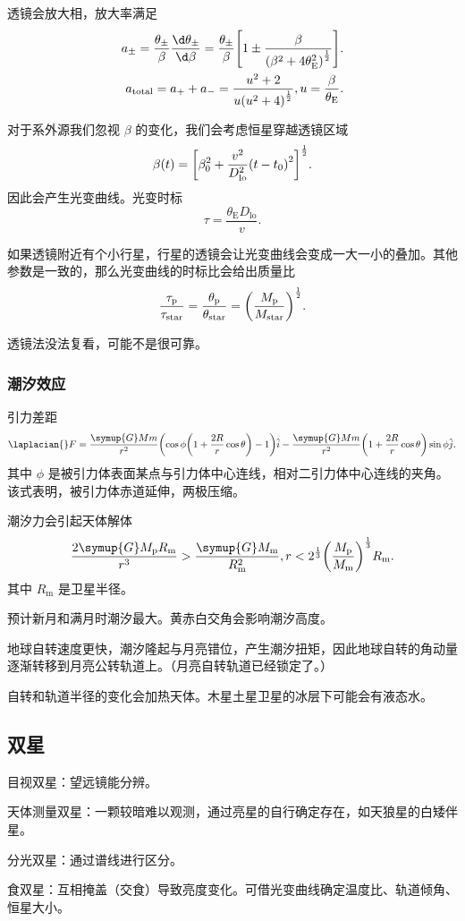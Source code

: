 \documentclass[../天体物理基础.tex]{subfiles}
\begin{document}
透镜会放大相，放大率满足
\begin{align}
a_{\pm}=\frac{\theta_{\pm}}{\beta}\frac{\d\theta_{\pm}}{\d\beta}=\frac{\theta_{\pm}}{\beta}\mleft[1\pm\frac{\beta}{\mleft(\beta^{2}+4\theta_{\mathrm{E}}^{2}\mright)^{\frac{1}{2}}}\mright].\\
a_{\mathrm{total}}=a_{+}+a_{-}=\frac{u^{2}+2}{u\mleft(u^{2}+4\mright)^{\frac{1}{2}}}, u=\frac{\beta}{\theta_{\mathrm{E}}}.
\end{align}

对于系外源我们忽视 $\beta$ 的变化，我们会考虑恒星穿越透镜区域
\begin{equation}
\beta\mleft(t\mright)=\mleft[\beta_{0}^{2}+\frac{v^{2}}{D_{\mathrm{lo}}^{2}}\mleft(t-t_{0}\mright)^{2}\mright]^{\frac{1}{2}}.
\end{equation}
因此会产生光变曲线。光变时标
\begin{equation}
\tau=\frac{\theta_{\mathrm{E}}D_{\mathrm{lo}}}{v}.
\end{equation}

如果透镜附近有个小行星，行星的透镜会让光变曲线会变成一大一小的叠加。其他参数是一致的，那么光变曲线的时标比会给出质量比
\begin{equation}
\frac{\tau_{\mathrm{p}}}{\tau_{\mathrm{star}}}=\frac{\theta_{\mathrm{p}}}{\theta_{\mathrm{star}}}=\mleft(\frac{M_{\mathrm{p}}}{M_{\mathrm{star}}}\mright)^{\frac{1}{2}}.
\end{equation}

透镜法没法复看，可能不是很可靠。

\subsubsection{潮汐效应}
引力差距
\begin{equation}
\laplacian{}F=\frac{\symup{G}Mm}{r^{2}}\mleft(\cos{\phi}\mleft(1+\frac{2R}{r}\cos{\theta}\mright)-1\mright)\hat{i}-\frac{\symup{G}Mm}{r^{2}}\mleft(1+\frac{2R}{r}\cos{\theta}\mright)\sin{\phi}\hat{j}.
\end{equation}
其中 $\phi$ 是被引力体表面某点与引力体中心连线，相对二引力体中心连线的夹角。该式表明，被引力体赤道延伸，两极压缩。

潮汐力会引起天体解体
\begin{equation}
\frac{2\symup{G}M_{\mathrm{p}}R_{\mathrm{m}}}{r^{3}}>\frac{\symup{G}M_{\mathrm{m}}}{R_{\mathrm{m}}^{2}}, r<2^{\frac{1}{3}}\mleft(\frac{M_{\mathrm{p}}}{M_{\mathrm{m}}}\mright)^{\frac{1}{3}}R_{\mathrm{m}}.
\end{equation}
其中 $R_{\mathrm{m}}$ 是卫星半径。

预计新月和满月时潮汐最大。黄赤白交角会影响潮汐高度。

地球自转速度更快，潮汐隆起与月亮错位，产生潮汐扭矩，因此地球自转的角动量逐渐转移到月亮公转轨道上。（月亮自转轨道已经锁定了。）

自转和轨道半径的变化会加热天体。木星土星卫星的冰层下可能会有液态水。

\subsection{双星}
目视双星：望远镜能分辨。

天体测量双星：一颗较暗难以观测，通过亮星的自行确定存在，如天狼星的白矮伴星。

分光双星：通过谱线进行区分。

食双星：互相掩盖（交食）导致亮度变化。可借光变曲线确定温度比、轨道倾角、恒星大小。
\end{document}
